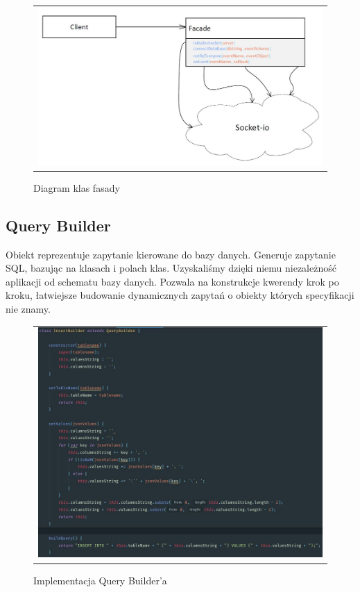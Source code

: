 \documentclass{sprawozdanie-agh}
\begin{document}
	\begin{figure}[H] 
		\centering
		\begin{tabular}{c}
			\includegraphics[width=.75\textwidth]{Fasadaclass}
		\end{tabular} 
		\caption{Diagram klas fasady}
	\end{figure}
	
	\subsection{Query Builder}
	
	Obiekt reprezentuje zapytanie kierowane do bazy danych. Generuje zapytanie SQL, bazując na
	klasach i polach klas. Uzyskaliśmy dzięki niemu niezależność aplikacji od schematu bazy danych.	Pozwala na konstrukcje kwerendy krok po kroku, łatwiejsze budowanie dynamicznych zapytań o obiekty których specyfikacji nie znamy.
	
	\begin{figure}[H] 
		\centering
		\begin{tabular}{c}
			\includegraphics[width=.99\textwidth]{insertbuilder}
		\end{tabular} 
		\caption{Implementacja Query Builder'a}
	\end{figure}
\end{document}
